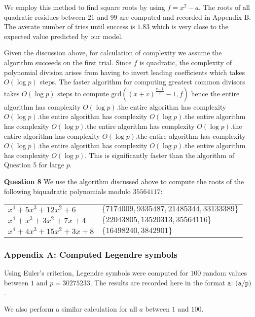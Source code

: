 \documentclass[12pt]{article}
\begin{document}
We employ this method to find square roots by using \(f=x^2-a\). The
roots of all quadratic residues between \(21\) and \(99\) are computed
and recorded in Appendix B. The averate number of tries until success
is \(1.83\) which is very close to the expected value predicted by our model.

Given the discussion above, for calculation of complexity we assume the
algorithm succeeds on the first trial. Since \(f\) is quadratic, the complexity
of polynomial division arises from having to invert leading coefficients which
takes \(O(\log p)\) steps. The faster algorithm for computing greatest common
divisors takes \(O(\log p)\) steps to compute
\(\text{gcd}((x+v)^\frac{p-1}{2}-1, f)\) hence the entire algorithm has
complexity \(O(\log p)\).the entire algorithm has complexity \(O(\log p)\).the
entire algorithm has complexity \(O(\log p)\).the entire algorithm has
complexity \(O(\log p)\).the entire algorithm has complexity \(O(\log p)\).the
entire algorithm has complexity \(O(\log p)\).the entire algorithm has
complexity \(O(\log p)\).the entire algorithm has complexity \(O(\log p)\).the
entire algorithm has complexity \(O(\log p)\). This is significantly faster than
the algorithm of Question 5 for large \(p\).

\textbf{Question 8} \quad We use the algorithm discussed above to compute the
roots of the following biquadratic polynomials modulo \(35564117\):

\begin{tabular}{ll}
    \(x^4 + 5x^3 + 12x^2 + 6\) &\(\{7174009, 9335487, 21485344, 33133389\}\)\\
    \(x^4 + x^3 + 3x^2 + 7x + 4\) &\(\{22043805, 13520313, 35564116\}\)\\
    \(x^4 + 4x^3 + 15x^2 + 3x + 8\) &\(\{16498240, 3842901\}\)
\end{tabular}

\subsubsection*{Appendix A: Computed Legendre symbols}
Using Euler's criterion, Legendre symbols were computed for \(100\) random
values between \(1\) and \(p=30275233\). The results are recorded here in the
format \(\texttt{a: (a/p)}\).

 

We also perform a similar calculation for all \(a\) between \(1\) and \(100\).

 
\end{document}
